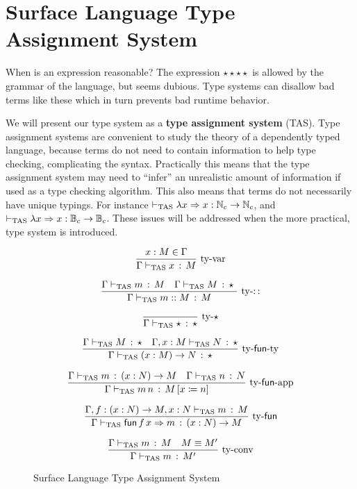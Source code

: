 \section{Surface Language Type Assignment System}
 
When is an expression reasonable? The expression $\star\star\star\star$ is allowed by the grammar of the language, but seems dubious.
Type systems can disallow bad terms like these which in turn prevents bad runtime behavior.
 
We will present our type system as a \textbf{type assignment system} (\ac{TAS}).
Type assignment systems are convenient to study the theory of a dependently typed language, because terms do not need to contain information to help type checking, complicating the syntax. %
Practically this means that the type assignment system may need to ``infer'' an unrealistic amount of information if used as a type checking algorithm.
This also means that terms do not necessarily have unique typings.
For instance $\vdash_{\mathrm{TAS}}\lambda x\Rightarrow x:\mathbb{N}_{c}\rightarrow\mathbb{N}_{c}$, and $\vdash_{\mathrm{TAS}}\lambda x\Rightarrow x:\mathbb{B}_{c}\rightarrow\mathbb{B}_{c}$.
These issues will be addressed when the more practical, \bidir{} type system is introduced.
 
\begin{figure}
\[
\frac{x:M\in\Gamma}{\Gamma\vdash_{\mathrm{TAS}} x\,:\,M}\,\operatorname{ty-var}
\]
 
\[
\frac{\Gamma\vdash_{\mathrm{TAS}} m\,:\,M \quad \Gamma\vdash_{\mathrm{TAS}} M\,:\,\star\
}{\Gamma\vdash_{\mathrm{TAS}} m::M\,:\,M}
\,\operatorname{ty-::}
\]
 
\[
\frac{{\color{gray}\ }}{\Gamma\tasys\star\,:\,\star}\,\rulename{ty-\star}
\]
 
\[
\frac{\Gamma\vdash_{\mathrm{TAS}} M\,:\,\star\quad\Gamma,x:M\vdash_{\mathrm{TAS}} N\,:\,\star}{\Gamma\vdash_{\mathrm{TAS}}\left(x:M\right)\rightarrow N\,:\,\star}\,\operatorname{ty-\mathsf{fun}-ty}
\]
 
\[
\frac{\Gamma\vdash_{\mathrm{TAS}} m\,:\,\left(x:N\right)\rightarrow M\quad\Gamma\vdash_{\mathrm{TAS}} n\,:\,N}{\Gamma\vdash_{\mathrm{TAS}} m\,n\,:\,M\left[x\coloneqq n\right]}\,\operatorname{ty-\mathsf{fun}-app}
\]
 
\[
\frac{\Gamma,f:\left(x:N\right)\rightarrow M,x:N\vdash_{\mathrm{TAS}} m\,:\,M}{\Gamma\vdash_{\mathrm{TAS}}\mathsf{fun}\,f\,x\Rightarrow m\,:\,\left(x:N\right)\rightarrow M}\,\operatorname{ty-\mathsf{fun}}
\]
 
\[
\frac{\Gamma\vdash_{\mathrm{TAS}} m\,:\,M\quad M\equiv M'}{\Gamma\vdash_{\mathrm{TAS}} m\,:\,M'}\,\operatorname{ty-conv}
\]
 
\caption{Surface Language Type Assignment System}
\label{fig:surface-TAS}
\end{figure}
 
